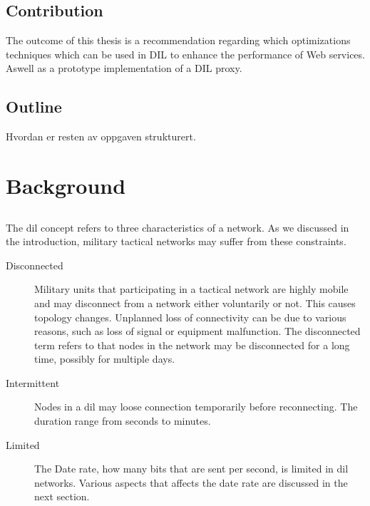 \documentclass[USenglish]{ifimaster}
\begin{document}
\section{Contribution}

The outcome of this thesis is a recommendation regarding which optimizations
techniques which can be used in DIL to enhance the performance of Web services.
Aswell as a prototype implementation of a DIL proxy.

\section{Outline}
Hvordan er resten av oppgaven strukturert.


\chapter{Background}

\section{}
\label{dil}

The \gls{dil} concept refers to three characteristics of a network. As we
discussed in the introduction, military tactical networks may suffer from these
constraints.

\begin{description}
\item[Disconnected]
Military units that participating in a tactical network are highly mobile
and may disconnect from a network either voluntarily or not. This causes
topology changes. Unplanned loss of connectivity can be due to various reasons,
such as loss of signal or equipment malfunction.  The disconnected term refers
to that nodes in the network may be disconnected for a long time, possibly for
multiple days.
\item[Intermittent]
Nodes in a \gls{dil} may loose connection temporarily before reconnecting. The
duration range from seconds to minutes.

\item[Limited] The Date rate, how many bits that are sent per second, is limited
in \gls{dil} networks. Various aspects that affects the date rate are discussed
in the next section.

\end{description}
\end{document}

